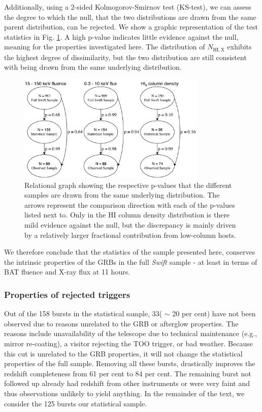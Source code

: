 \documentclass{aa}    %
\begin{document}
Additionally, using a 2-sided Kolmogorov-Smirnov test (KS-test), we can assess
the degree to which the null, that the two distributions are drawn from the same
parent distribution, can be rejected. We show a graphic representation of the
test statistics in Fig. \ref{fig:p_values}. A high p-value indicates little
evidence against the null, meaning for the properties investigated here. The
distribution of $N_{\mathrm{HI,X}}$ exhibits the highest degree of
dissimilarity, but the two distribution are still consistent with being drawn
from the same underlying distribution.

\begin{figure}
	\centerline{\includegraphics[width=9cm]{figures/XSGRB_p_values.pdf}}
\caption{Relational graph showing the respective p-values that the different
	samples are drawn from the same underlying distribution. The arrows represent
	the comparison direction with each of the p-values listed next to. Only in the
	HI column density distribution is there mild evidence against the null, but the
	discrepancy is mainly driven by a relatively larger fractional contribution
	from low-column hosts.} \label{fig:p_values}
\end{figure}

We therefore conclude that the statistics of the sample presented here,
conserves the intrinsic properties of the GRBs in the full \textit{Swift} sample
- at least in terms of BAT fluence and X-ray flux at 11 hours.

\subsubsection{Properties of rejected triggers} \label{badbursts}

Out of the 158 bursts in the statistical sample, 33( $\sim$ 20 per cent) have
not been observed due to reasons unrelated to the GRB or afterglow properties.
The reasons include unavailability of the telescope due to technical maintenance
(e.g., mirror re-coating), a visitor rejecting the TOO trigger, or bad weather.
Because this cut is unrelated to the GRB properties, it will not change the
statistical properties of the full sample. Removing all these bursts,
drastically improves the redshift completeness from 61 per cent to 84 per cent.
The remaining burst not followed up already had redshift from other instruments
or were very faint and thus observations unlikely to yield anything. In the
remainder of the text, we consider the 125 bursts our statistical sample.
\end{document}
